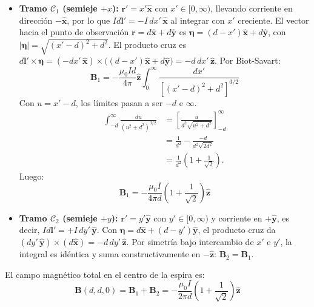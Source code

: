 \documentclass[11pt]{article}
\begin{document}
\begin{itemize}
    \item \textbf{Tramo $\mathcal C_1$ (semieje $+x$):} $\mathbf{r}' = x' \hat{\mathbf{x}}$ con $x' \in [0, \infty)$, llevando corriente en dirección $-\hat{\mathbf{x}}$, por lo que $I d\mathbf{l}' = -I\, dx'\, \hat{\mathbf{x}}$ al integrar con $x'$ creciente.
    El vector hacia el punto de observación $\mathbf{r} = d\hat{\mathbf{x}} + d\hat{\mathbf{y}}$ es $\boldsymbol{\eta} = (d - x')\hat{\mathbf{x}} + d\hat{\mathbf{y}}$, con $|\boldsymbol{\eta}| = \sqrt{(x' - d)^2 + d^2}$.
    El producto cruz es $d\mathbf{l}' \times \boldsymbol{\eta} = (-dx'\, \hat{\mathbf{x}}) \times \big((d - x')\hat{\mathbf{x}} + d\hat{\mathbf{y}}\big) = -d\, dx'\, \hat{\mathbf{z}}$.
    Por Biot-Savart:
    \begin{equation}
        \mathbf{B}_1 = -\frac{\mu_0 I d}{4\pi} \hat{\mathbf{z}} \int_0^\infty \frac{dx'}{\left[ (x' - d)^2 + d^2 \right]^{3/2}}
    \end{equation}
    Con $u=x'-d$, los límites pasan a ser $-d$ e $\infty$.
    \begin{align*}
        \int_{-d}^{\infty}\frac{du}{(u^2+d^2)^{3/2}}
        &=\left[\frac{u}{d^2\sqrt{u^2+d^2}}\right]_{-d}^{\infty}\\
        &=\frac{1}{d^2}-\frac{-d}{d^2\sqrt{2d^2}}\\
        &=\frac{1}{d^2}\left(1+\frac{1}{\sqrt{2}}\right).
    \end{align*}
    Luego:
    \begin{equation}
        \mathbf{B}_1 = -\frac{\mu_0 I}{4\pi d} \left( 1 + \frac{1}{\sqrt{2}} \right) \hat{\mathbf{z}}
    \end{equation}
    \item \textbf{Tramo $\mathcal C_2$ (semieje $+y$):} $\mathbf{r}' = y' \hat{\mathbf{y}}$ con $y' \in [0, \infty)$ y corriente en $+\hat{\mathbf{y}}$, es decir, $I d\mathbf{l}' = +I\, dy'\, \hat{\mathbf{y}}$. Con $\boldsymbol{\eta} = d\hat{\mathbf{x}} + (d - y')\hat{\mathbf{y}}$, el producto cruz da $(dy'\, \hat{\mathbf{y}}) \times (d\hat{\mathbf{x}}) = -d\, dy'\, \hat{\mathbf{z}}$. Por simetría bajo intercambio de $x'$ e $y'$, la integral es idéntica y suma constructivamente en $-\hat{\mathbf{z}}$: $\mathbf{B}_2 = \mathbf{B}_1$.
\end{itemize}
El campo magnético total en el centro de la espira es:
\begin{equation}
    \mathbf{B}(d, d, 0) = \mathbf{B}_1 + \mathbf{B}_2 = -\frac{\mu_0 I}{2\pi d} \left( 1 + \frac{1}{\sqrt{2}} \right) \hat{\mathbf{z}}
\end{equation}
\end{document}
